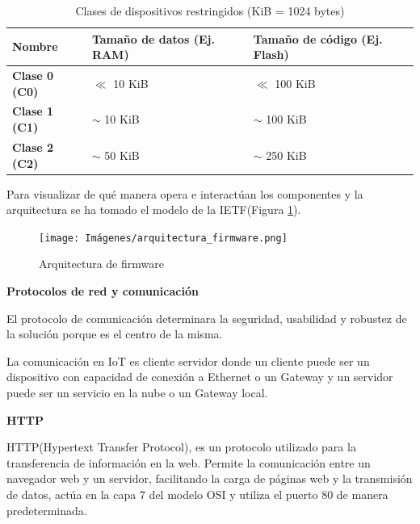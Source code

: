 \begin{itemize}
\begin{table}[ht]
    \centering
    \begin{tabular}{|>{\centering\arraybackslash}p{4cm}|>{\centering\arraybackslash}p{4cm}|>{\centering\arraybackslash}p{4cm}|}
        \hline
        \textbf{Nombre} & \textbf{Tamaño de datos} \newline \textbf{(Ej. RAM)} & \textbf{Tamaño de código} \newline \textbf{(Ej. Flash)}\\
        \hline
        \textbf{Clase 0 (C0)}  & $\ll$ 10 KiB   & $\ll$ 100 KiB \\
        \textbf{Clase 1 (C1)}  & $\sim$ 10 KiB  & $\sim$ 100 KiB \\
        \textbf{Clase 2 (C2)}  & $\sim$ 50 KiB  & $\sim$ 250 KiB \\
        \hline
    \end{tabular}
    \caption{Clases de dispositivos restringidos (KiB = 1024 bytes)}
    \label{tab:Clases_de_dispositivos_restringidos}
\end{table}

\end{itemize}

Para visualizar de qué manera opera e interactúan los componentes y la arquitectura se ha tomado el modelo de la IETF(Figura \ref{fig:arquitectura_de_firmware}).\cite{rfc9019}

\begin{figure} [ht]
    \centering
     \texttt{[image: Imágenes/arquitectura\_firmware.png]}
    \caption{Arquitectura de firmware}
    \label{fig:arquitectura_de_firmware}
\end{figure}

\newpage

\textbf{Protocolos de red y comunicación}

El protocolo de comunicación determinara la seguridad, usabilidad y robustez de la solución porque es el centro de la misma.

La comunicación en IoT es cliente servidor donde un cliente puede ser un dispositivo con capacidad de conexión a Ethernet o un Gateway y un servidor puede ser un servicio en la nube o un Gateway local.\cite{brea2018hub}

\textbf{HTTP} 

HTTP(Hypertext Transfer Protocol), es un protocolo utilizado para la transferencia de información en la web. Permite la comunicación entre un navegador web y un servidor, facilitando la carga de páginas web y la transmisión de datos, actúa en la capa 7 del modelo OSI y utiliza el puerto 80 de manera predeterminada.

